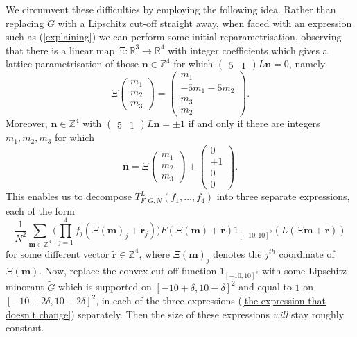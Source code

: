 \documentclass[12pt,a4paper,twoside,reqno]{amsart}
\numberwithin{equation}{section}
\begin{document}
We circumvent these difficulties by employing the following idea. Rather than replacing $G$ with a Lipschitz cut-off straight away, when faced with an expression such as (\ref{explaining}) we can perform some initial reparametrisation, observing that there is a linear map $\Xi:\mathbb{R}^3 \longrightarrow \mathbb{R}^4$ with integer coefficients which gives a lattice parametrisation of those $\mathbf{n} \in \mathbb{Z}^4$ for which $(\begin{matrix}5 & 1 \end{matrix})L\mathbf{n}  = 0$, namely \[ \Xi\left(\begin{matrix} m_1 \\m_2 \\m_3 \end{matrix} \right) = \left(\begin{matrix} m_1 \\ -5m_1 - 5m_2 \\ m_3 \\ m_2 \end{matrix}\right).\] Moreover, $\mathbf{n} \in \mathbb{Z}^4$ with $(\begin{matrix}5 & 1 \end{matrix})L\mathbf{n} = \pm 1$ if and only if there are integers $m_1,m_2,m_3$ for which \[ \mathbf{n} = \Xi\left(\begin{matrix} m_1 \\m_2 \\m_3 \end{matrix} \right) + \left(\begin{matrix} 0 \\ \pm 1 \\ 0 \\0\end{matrix}\right).\] This enables us to decompose $T_{F,G,N}^L(f_1,\dots,f_4)$ into three separate expressions, each of the form 
\begin{equation}
\label{the expression that doesn't change}
\frac{1}{N^2} \sum\limits_{\mathbf{m} \in \mathbb{Z}^3 } \Big( \prod\limits_{j=1}^4 f_j(\Xi(\mathbf{m})_j+ \widetilde{\mathbf{r}}_j) \Big) F(\Xi(\mathbf{m}) + \widetilde{\mathbf{r}})1_{[-10,10]^2}(L(\Xi\mathbf{m} + \widetilde{\mathbf{r}}))
\end{equation} for some different vector $\widetilde{\mathbf{r}} \in \mathbb{Z}^4$, where $\Xi(\mathbf{m})_j$ denotes the $j^{th}$ coordinate of $\Xi(\mathbf{m})$. Now, replace the convex cut-off function $1_{[-10,10]^2}$ with some Lipschitz minorant $\widetilde{G}$ which is supported on $[-10 + \delta, 10 - \delta]^2$ and equal to $1$ on $[-10 + 2 \delta, 10 - 2 \delta]^2$, in each of the three expressions (\ref{the expression that doesn't change}) separately. Then the size of these expressions \emph{will} stay roughly constant. 
\end{document}
